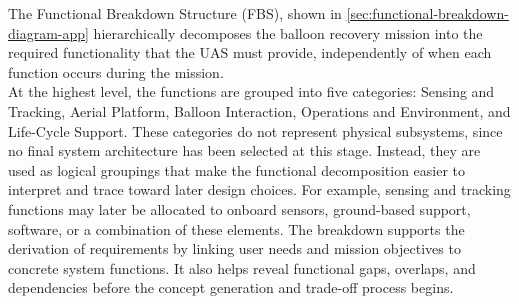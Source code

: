The Functional Breakdown Structure (FBS), shown in \autoref{sec:functional-breakdown-diagram-app} hierarchically decomposes the balloon recovery mission into the required functionality that the UAS must provide, independently of when each function occurs during the mission.\\
At the highest level, the functions are grouped into five categories: Sensing and Tracking, Aerial Platform, Balloon Interaction, Operations and Environment, and Life-Cycle Support. These categories do not represent physical subsystems, since no final system architecture has been selected at this stage. Instead, they are used as logical groupings that make the functional decomposition easier to interpret and trace toward later design choices. For example, sensing and tracking functions may later be allocated to onboard sensors, ground-based support, software, or a combination of these elements. The breakdown supports the derivation of requirements by linking user needs and mission objectives to concrete system functions. It also helps reveal functional gaps, overlaps, and dependencies before the concept generation and trade-off process begins.\\
\vspace{-10pt}
\bgroup
\renewcommand{\arraystretch}{1.1}
